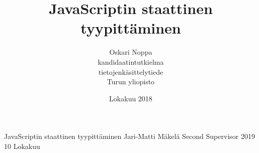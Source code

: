 \documentclass[a4paper, 12pt]{report}
\title{JavaScriptin staattinen tyypittäminen}
\author{Oskari Noppa \\kandidaatintutkielma \\ tietojenkäsittelytiede \\ Turun yliopisto}
\date{Lokakuu 2018}
\begin{document}
  \fintrue

  \iffin
  \renewcommand{\appname}{Liitteet}
  \else
  \renewcommand{\appname}{Appendices}
  \fi
  
  {JavaScriptin staattinen tyypittäminen}
  {Jari-Matti Mäkelä}
  {Second Supervisor}
  {2019}
  {10}
  {Lokakuu}
  
  
  \gentitle
  \pagestyle{empty}
  
  
\end{document}
